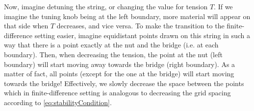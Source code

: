 \documentclass[dvipsnames]{article}
\begin{document}
\begin{figure}[ht!]
    \centering
\end{figure}



Now, imagine detuning the string, or changing the value for tension $T$. If we imagine the tuning knob being at the left boundary, more material will appear on that side when $T$ decreases, and vice versa. To make the transition to the finite-difference setting easier, imagine equidistant points drawn on this string in such a way that there is a point exactly at the nut and the bridge (i.e. at each boundary). Then, when decreasing the tension, the point at the nut (left boundary) will start moving away towards the bridge (right boundary). As a matter of fact, all points (except for the one at the bridge) will start moving towards the bridge! Effectively, we slowly decrease the space between the points which in finite-difference setting is analogous to decreasing the grid spacing according to \eqref{eq:stabilityCondition}. 
\end{document}
